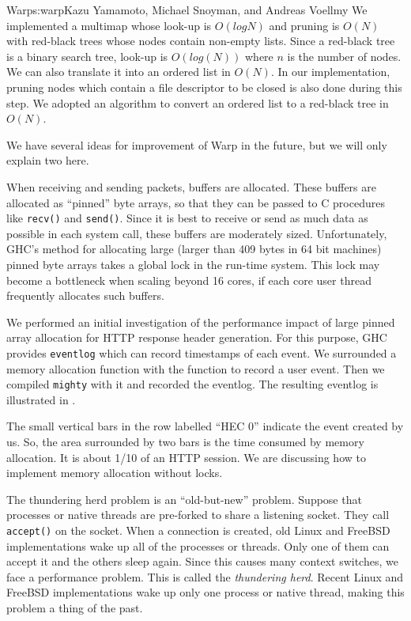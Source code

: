 \begin{aosachapter}{Warp}{s:warp}{Kazu Yamamoto, Michael Snoyman, and Andreas Voellmy}
We implemented a multimap whose look-up is $O(log N)$ and pruning is $O(N)$
with red-black trees whose nodes contain non-empty lists. Since a
red-black tree is a binary search tree, look-up is $O(log(N))$ where $n$ is
the number of nodes. We can also translate it into an ordered list in
$O(N)$. In our implementation, pruning nodes which contain a file
descriptor to be closed is also done during this step. We adopted an
algorithm to convert an ordered list to a red-black tree in $O(N)$.

\newpage


We have several ideas for improvement of Warp in the future, but we will
only explain two here.


\label{sec.warp.memory}

When receiving and sending packets, buffers are allocated. These buffers
are allocated as ``pinned'' byte arrays, so that they can be passed to C
procedures like \texttt{recv()} and \texttt{send()}. Since it is best to
receive or send as much data as possible in each system call, these
buffers are moderately sized. Unfortunately, GHC's method for allocating
large (larger than 409 bytes in 64 bit machines) pinned byte arrays
takes a global lock in the run-time system. This lock may become a
bottleneck when scaling beyond 16 cores, if each core user thread
frequently allocates such buffers.

We performed an initial investigation of the performance impact of large
pinned array allocation for HTTP response header generation. For this
purpose, GHC provides \texttt{eventlog} which can record timestamps of
each event. We surrounded a memory allocation function with the function
to record a user event. Then we compiled \texttt{mighty} with it and
recorded the eventlog. The resulting eventlog is illustrated in 
.


The small vertical bars in the row labelled ``HEC 0'' indicate the event
created by us. So, the area surrounded by two bars is the time consumed
by memory allocation. It is about 1/10 of an HTTP session. We are
discussing how to implement memory allocation without locks.


The thundering herd problem is an ``old-but-new'' problem. Suppose that
processes or native threads are pre-forked to share a listening socket.
They call \texttt{accept()} on the socket. When a connection is created,
old Linux and FreeBSD implementations wake up all of the processes or
threads. Only one of them can accept it and the others sleep again.
Since this causes many context switches, we face a performance problem.
This is called the \emph{thundering herd}. Recent Linux and FreeBSD
implementations wake up only one process or native thread, making this
problem a thing of the past.


\end{aosachapter}
